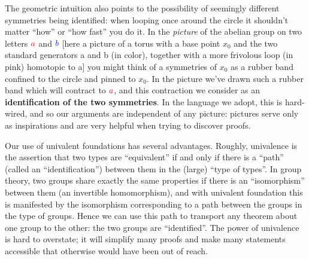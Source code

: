 The geometric intuition also points to the possibility of seemingly different symmetries being identified: when looping once around the circle it shouldn't matter ``how'' or ``how fast'' you do it. In the \emph{picture} of the abelian group on two letters ${\color{red}a}$ and ${\color{blue}b}$
[here a picture of a torus with a base point $x_0$ and the two standard generators a and b (in color), together with a more frivolous loop (in pink) homotopic to a]
you might think of a symmetries of $x_0$ as a {\color{pink}rubber band} confined to the circle and pinned to $x_0$. In the picture we've drawn such a {\color{pink}rubber band} which will contract to ${\color{red}a}$, and this contraction we consider as an \textbf{identification of the two symmetries}.
In the language we adopt, this is hard-wired, and so our arguments are independent of any picture: pictures serve only as inspirations and are very helpful when trying to discover proofs.


Our use of univalent foundations has several advantages. Roughly, univalence is the assertion that two types are ``equivalent'' if and only if there is a ``path'' (called an ``identification'') between them in the (large) ``type of types''. In group theory, two groups share exactly the same properties if there is an ``isomorphism'' between them (an invertible homomorphism), and with univalent foundation this is manifested by the isomorphism corresponding to a path between the groups in the type of groups. Hence we can use this path to transport any theorem about one group to the other: the two groups are ``identified''. The power of univalence is hard to overstate; it will simplify many proofs and make many statements accessible that otherwise would have been out of reach.

